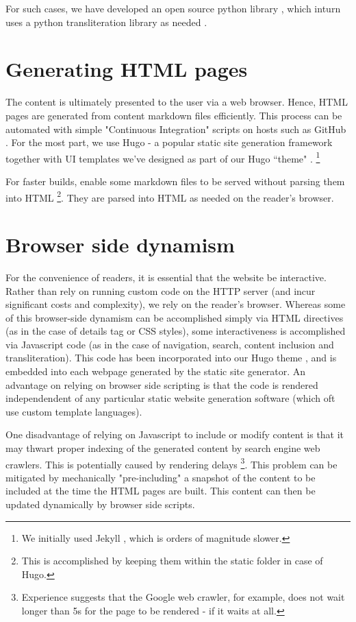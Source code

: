 \documentclass[11pt]{article}
\begin{document}
For such cases, we have developed an open source python library \cite{doc_curation}, which inturn uses a python transliteration library as needed  \cite{indic_transliteration_py}.

\section{Generating HTML pages}
The content is ultimately presented to the user via a web browser. Hence, HTML pages are generated from content markdown files efficiently. This process can be automated with simple "Continuous Integration" scripts on hosts such as GitHub \cite{vishvAsa_kalpAntaram_src}. For the most part, we use Hugo - a popular static site generation framework \cite{hugo} together with UI templates we've designed as part of our Hugo ``theme" \cite{sandoc_hugo}. \footnote{We initially used \cite{sandoc_jekyll} Jekyll \cite{jekyll}, which is orders of magnitude slower.}

For faster builds, enable some markdown files to be served without parsing them into HTML \footnote{This is accomplished by keeping them within the static folder in case of Hugo.}. They are parsed into HTML as needed on the reader's browser.

\section{Browser side dynamism}
For the convenience of readers, it is essential that the website be interactive. Rather than rely on running custom code on the HTTP server (and incur significant costs and complexity), we rely on the reader's browser. Whereas some of this browser-side dynamism can be accomplished simply via HTML directives (as in the case of details tag or CSS styles), some interactiveness is accomplished via Javascript code (as in the case of navigation, search, content inclusion and transliteration). This code has been incorporated into our Hugo theme \cite{sandoc_hugo}, and is embedded into each webpage generated by the static site generator. An advantage on relying on browser side scripting is that the code is rendered independendent of any particular static website generation software (which oft use custom template languages). 

One disadvantage of relying on Javascript to include or modify content is that it may thwart proper indexing of the generated content by search engine web crawlers. This is potentially caused by rendering delays \footnote{Experience suggests that the Google web crawler, for example, does not wait longer than 5s for the page to be rendered - if it waits at all.}. This problem can be mitigated by mechanically "pre-including" a snapshot of the content to be included at the time the HTML pages are built. This content can then be updated dynamically by browser side scripts. 
\end{document}
